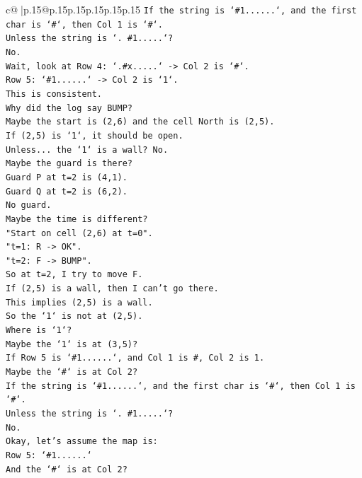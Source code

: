 \documentclass{article}
\begin{document}
{\begin{supertabular}{c@{$\;$}|p{.15\linewidth}@{}p{.15\linewidth}p{.15\linewidth}p{.15\linewidth}p{.15\linewidth}p{.15\linewidth}}
{{{\texttt{If the string is `\#1......`, and the first char is `\#`, then Col 1 is `\#`.} \\
\texttt{Unless the string is `. \#1.....`?} \\
\texttt{No.} \\
\texttt{Wait, look at Row 4: `.\#x.....` {-}> Col 2 is `\#`.} \\
\texttt{Row 5: `\#1......` {-}> Col 2 is `1`.} \\
\texttt{This is consistent.} \\
\texttt{Why did the log say BUMP?} \\
\texttt{Maybe the start is (2,6) and the cell North is (2,5).} \\
\texttt{If (2,5) is `1`, it should be open.} \\
\texttt{Unless... the `1` is a wall? No.} \\
\texttt{Maybe the guard is there?} \\
\texttt{Guard P at t=2 is (4,1).} \\
\texttt{Guard Q at t=2 is (6,2).} \\
\texttt{No guard.} \\
\texttt{Maybe the time is different?} \\
\texttt{"Start on cell (2,6) at t=0".} \\
\texttt{"t=1: R {-}> OK".} \\
\texttt{"t=2: F {-}> BUMP".} \\
\texttt{So at t=2, I try to move F.} \\
\texttt{If (2,5) is a wall, then I can't go there.} \\
\texttt{This implies (2,5) is a wall.} \\
\texttt{So the `1` is not at (2,5).} \\
\texttt{Where is `1`?} \\
\texttt{Maybe the `1` is at (3,5)?} \\
\texttt{If Row 5 is `\#1......`, and Col 1 is \#, Col 2 is 1.} \\
\texttt{Maybe the `\#` is at Col 2?} \\
\texttt{If the string is `\#1......`, and the first char is `\#`, then Col 1 is `\#`.} \\
\texttt{Unless the string is `. \#1.....`?} \\
\texttt{No.} \\
\texttt{Okay, let's assume the map is:} \\
\texttt{Row 5: `\#1......`} \\
\texttt{And the `\#` is at Col 2?} \\
}}}
\end{supertabular}}
\end{document}
